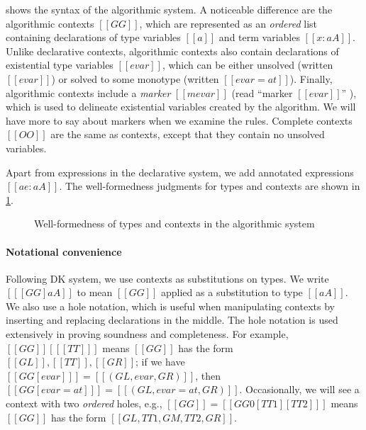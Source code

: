  shows the syntax of the algorithmic system. A
noticeable difference are the
algorithmic contexts $[[GG]]$, which are represented as an
\emph{ordered} list containing declarations of type variables $[[a]]$ and term
variables $[[x : aA]]$. Unlike declarative contexts, algorithmic contexts also
contain declarations of existential type variables $[[evar]]$, which can be either
unsolved (written $[[evar]]$) or solved to some monotype (written $[[evar = at]]$). Finally, algorithmic contexts
include a \textit{marker} $[[ mevar  ]]$ (read ``marker $[[evar]]$'' ), which is used to delineate existential variables created by the algorithm. We will have more
to say about markers when we examine the rules.
Complete contexts $[[OO]]$ are the same as contexts, except that they contain no unsolved variables.

Apart from expressions in the declarative system, we add annotated expressions
$[[ ae : aA ]]$. The well-formedness judgments for types and contexts are shown in \cref{fig:well-formedness}.

\begin{figure}[t]
  \centering
  \begin{small}



  \end{small}
  \caption{Well-formedness of types and contexts in the algorithmic system}
  \label{fig:well-formedness}
\end{figure}

\paragraph{Notational convenience}
Following DK system, we use contexts as substitutions on
types. We write $[[ [GG]aA  ]]$ to mean $[[GG]]$ applied as a
substitution to type $[[aA]]$. We also use a hole notation, which is useful when
manipulating contexts by inserting and replacing declarations in the middle. The
hole notation is used extensively in proving soundness and completeness. For
example, $[[GG]] [ [[TT]]   ]$ means $[[GG]]$ has the form $[[GL]], [[TT]], [[GR]]$;
if we have $[[ GG[evar]  ]] = [[(GL, evar, GR)]]$, then
$[[  GG[evar = at]  ]] = [[(GL, evar = at, GR)]] $. Occasionally,
we will see a context with two \emph{ordered} holes, e.g., $[[GG]] = [[ GG0[TT1][TT2] ]]$ means $[[GG]]$ has the form
$[[ GL, TT1, GM, TT2, GR ]]$.

